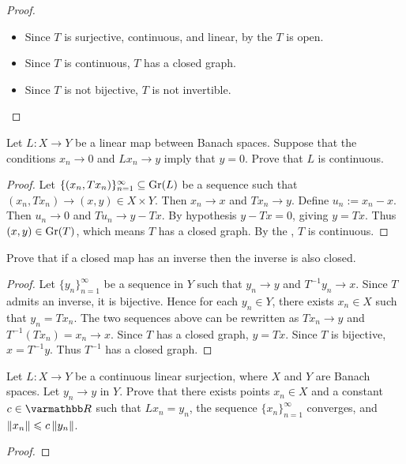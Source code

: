 \begin{proof}
\begin{itemize}[itemsep=1pt,topsep=3pt]
        \item Since $T$ is surjective, continuous, and linear, by the  $T$ is open.
        
        \item Since $T$ is continuous, $T$ has a closed graph.
        
        \item Since $T$ is not bijective, $T$ is not invertible.
        \end{itemize}
    \end{proof}

\begin{exercise}
    Let $L:X \rightarrow Y$ be a linear map between Banach spaces. Suppose that the conditions $x_n \rightarrow 0$ and $L x_n \rightarrow y$ imply that $y = 0$. Prove that $L$ is continuous.
\end{exercise}
    \begin{proof}
    Let $\{(x_n, Tx_n)\}_{n = 1}^\infty \subseteq \operatorname{Gr}(L)$ be a sequence such that $(x_n,T x_n) \rightarrow (x,y) \in X \times Y$. Then $x_n \rightarrow x$ and $T x_n \rightarrow y$. Define $u_n:= x_n - x$. Then $u_n \rightarrow 0$ and $T u_n \rightarrow y - Tx$. By hypothesis $y-Tx = 0$, giving $y = Tx$. Thus $(x,y) \in \operatorname{Gr}(T)$, which means $T$ has a closed graph. By the , $T$ is continuous.
    \end{proof}

\begin{exercise}
Prove that if a closed map has an inverse then the inverse is also closed.
\end{exercise}
    \begin{proof}
        Let $\{y_n\}_{n = 1}^\infty$ be a sequence in $Y$ such that $y_n \rightarrow y$ and $T^{-1}y_n \rightarrow x$. Since $T$ admits an inverse, it is bijective. Hence for each $y_n \in Y$, there exists $x_n \in X$ such that $y_n = T x_n$. The two sequences above can be rewritten as $T x_n \rightarrow y$ and $T^{-1}(T x_n) = x_n \rightarrow x$. Since $T$ has a closed graph, $y = Tx$. Since $T$ is bijective, $x = T^{-1} y$. Thus $T^{-1}$ has a closed graph.
    \end{proof}

\begin{exercise}
Let $L:X \rightarrow Y$ be a continuous linear surjection, where $X$ and $Y$ are Banach spaces. Let $y_n \rightarrow y$ in $Y$. Prove that there exists points $x_n \in X$ and a constant $c \in \bfR$ such that $L x_n = y_n$, the sequence $\{x_n\}_{n = 1}^\infty$ converges, and $\left\lVert x_n \right\rVert \leqslant c \left\lVert y_n \right\rVert$.
\end{exercise}
    {\color{red} \begin{proof}
        
    \end{proof}}

